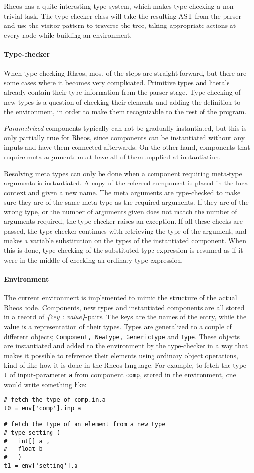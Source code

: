 Rheos has a quite interesting type system, which makes type-checking a
non-trivial task. The type-checker class will take the resulting AST
from the parser and use the visitor pattern to traverse the tree,
taking appropriate actions at every node while building an
environment.

\paragraph{Type-checker}
When type-checking Rheos, most of the steps are straight-forward, but
there are some cases where it becomes very complicated. Primitive
types and literals already contain their type information from the
parser stage. Type-checking of new types is a question of checking
their elements and adding the definition to the environment, in order
to make them recognizable to the rest of the program.

\emph{Parametrized} components typically can not be gradually
instantiated, but this is only partially true for Rheos, since
components can be instantiated without any inputs and have them
connected afterwards. On the other hand, components that require
meta-arguments must have all of them supplied at instantiation.

Resolving meta types can only be done when a component requiring
meta-type arguments is instantiated. A copy of the referred component
is placed in the local context and given a new name. The meta
arguments are type-checked to make sure they are of the same meta type
as the required arguments. If they are of the wrong type, or the
number of arguments given does not match the number of arguments
required, the type-checker raises an exception. If all these checks
are passed, the type-checker continues with retrieving the type of the
argument, and makes a variable substitution on the types of the
instantiated component. When this is done, type-checking of the
substituted type expression is resumed as if it were in the middle of
checking an ordinary type expression.


\paragraph{Environment}
The current environment is implemented to mimic the structure of the
actual Rheos code. Components, new types and instantiated components
are all stored in a record of \emph{\{key : value\}}-pairs. The keys
are the names of the entry, while the value is a representation of
their types. Types are generalized to a couple of different objects;
\texttt{Component, Newtype, Generictype} and \texttt{Type}. These
objects are instantiated and added to the environment by the
type-checker in a way that makes it possible to reference their
elements using ordinary object operations, kind of like how it is done
in the Rheos language. For example, to fetch the type \texttt{t} of
input-parameter \texttt{a} from component \texttt{comp}, stored in the
environment, one would write something like:

\begin{lstlisting}
# fetch the type of comp.in.a
t0 = env['comp'].inp.a

# fetch the type of an element from a new type
# type setting (
#   int[] a ,
#   float b
#   )
t1 = env['setting'].a
\end{lstlisting}
